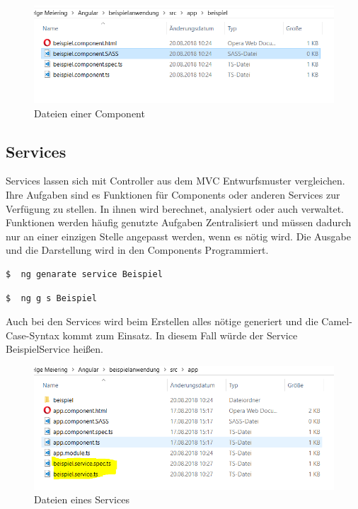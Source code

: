 \begin{figure}[H]
	\centering
	\includegraphics[scale=0.9]{content/pictures/componentfolder.png}
	\caption{ Dateien einer Component}
	\label{fig:component}
\end{figure}

\subsection{Services}
Services lassen sich mit Controller aus dem \ac{MVC} Entwurfsmuster vergleichen. Ihre Aufgaben sind es Funktionen für Components oder anderen Services zur Verfügung zu stellen. In ihnen wird berechnet, analysiert oder auch verwaltet. Funktionen werden häufig genutzte Aufgaben Zentralisiert und müssen dadurch nur an einer einzigen Stelle angepasst werden, wenn es nötig wird. Die Ausgabe und die Darstellung wird in den Components Programmiert. \autocite{Clow.2018}

\begin{lstlisting}[language=sh, frame=single]
$  ng genarate service Beispiel
\end{lstlisting} 

\begin{lstlisting}[language=sh, frame=single]
$  ng g s Beispiel
\end{lstlisting}

Auch bei den Services wird beim Erstellen alles nötige generiert und die Camel-Case-Syntax kommt zum Einsatz. In diesem Fall würde der Service BeispielService heißen.

\begin{figure}[H]
	\centering
	\includegraphics[scale=0.9]{content/pictures/services.png}
	\caption{ Dateien eines Services}
	\label{fig:service}
\end{figure}

